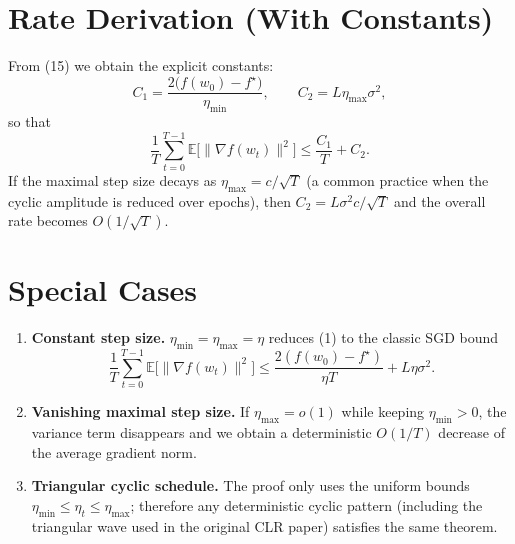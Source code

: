 \documentclass[11pt]{article}
\newcommand{\E}{\mathbb{E}}
\begin{document}
\section*{Rate Derivation (With Constants)}
From (15) we obtain the explicit constants:
\[
C_{1}= \frac{2\big(f(w_{0})-f^{\star}\big)}{\eta_{\min}},\qquad
C_{2}= L\eta_{\max}\sigma^{2},
\]
so that
\[
\frac{1}{T}\sum_{t=0}^{T-1}\E\!\big[\|\nabla f(w_{t})\|^{2}\big]
\le \frac{C_{1}}{T}+C_{2}.
\]
If the maximal step size decays as $\eta_{\max}=c/\sqrt{T}$ (a common practice when the cyclic amplitude is reduced over epochs), then $C_{2}=L\sigma^{2}c/\sqrt{T}$ and the overall rate becomes $O(1/\sqrt{T})$.

\section*{Special Cases}
\begin{enumerate}
    \item \textbf{Constant step size.} $\eta_{\min}=\eta_{\max}=\eta$ reduces (1) to the classic SGD bound
    \[
    \frac{1}{T}\sum_{t=0}^{T-1}\E\!\big[\|\nabla f(w_{t})\|^{2}\big]
    \le \frac{2(f(w_{0})-f^{\star})}{\eta T}+L\eta\sigma^{2}.
    \]
    \item \textbf{Vanishing maximal step size.} If $\eta_{\max}=o(1)$ while keeping $\eta_{\min}>0$, the variance term disappears and we obtain a deterministic $O(1/T)$ decrease of the average gradient norm.
    \item \textbf{Triangular cyclic schedule.} The proof only uses the uniform bounds $\eta_{\min}\le\eta_{t}\le\eta_{\max}$; therefore any deterministic cyclic pattern (including the triangular wave used in the original CLR paper) satisfies the same theorem.
\end{enumerate}

\end{document}
